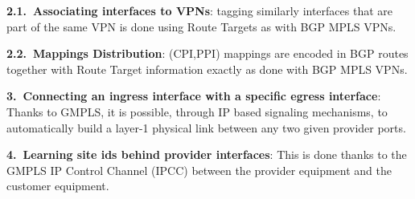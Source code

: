 \vspace{1mm}\noindent \textbf{2.1.~Associating interfaces to VPNs}: tagging similarly interfaces that are part of the same VPN is done using Route Targets as with BGP MPLS VPNs.

		\vspace{1mm}\noindent \textbf{2.2.~Mappings Distribution}: (CPI,PPI) mappings are encoded in BGP routes together with Route Target information exactly as done with BGP MPLS VPNs.

\vspace{1mm}\noindent \textbf{3.~Connecting an ingress interface with a specific egress interface}: Thanks to GMPLS, it is possible, through IP based signaling mechanisms, to automatically build a layer-1 physical link between any two given provider ports. 

	\vspace{1mm}\noindent \textbf{4.~Learning site ids behind provider interfaces}: This is done thanks to the GMPLS IP Control Channel (IPCC) between the provider equipment and the customer equipment.

















%
